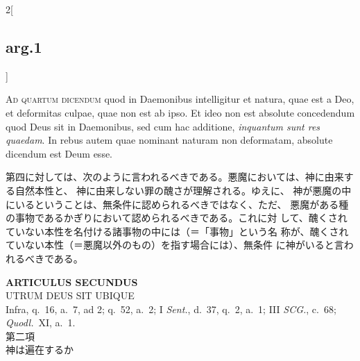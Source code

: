 \documentclass[paper=a4paper,fontsize=10pt,jafontsize=9pt,titlepage]{jlreq}
\begin{document}
\begin{paracol}{2}[\subsection{arg.1}]
\switchcolumn*[\subsection{ad.4}]

{\scshape Ad quartum dicendum} quod in Daemonibus intelligitur et natura, quae
 est a Deo, et deformitas culpae, quae non est ab ipso. Et ideo non est
 absolute concedendum quod Deus sit in Daemonibus, sed cum hac
 additione, {\itshape inquantum sunt res quaedam}. In rebus autem quae nominant
 naturam non deformatam, absolute dicendum est Deum esse.

\switchcolumn

第四に対しては、次のように言われるべきである。悪魔においては、神に由来する自然本性と、
 神に由来しない罪の醜さが理解される。ゆえに、
 神が悪魔の中にいるということは、無条件に認められるべきではなく、ただ、
 悪魔がある種の事物であるかぎりにおいて認められるべきである。これに対
 して、醜くされていない本性を名付ける諸事物の中には（＝「事物」という名
 称が、醜くされていない本性（＝悪魔以外のもの）を指す場合には）、無条件
 に神がいると言われるべきである。

\end{paracol}
\newpage
{}
 

\begin{center}
 {\Large {\bfseries ARTICULUS SECUNDUS}}\\
 {\large UTRUM DEUS SIT UBIQUE}\\
 {\footnotesize Infra, q.~16, a.~7, ad 2; q.~52, a.~2; I {\itshape
 Sent.}, d.~37, q.~2, a.~1; III {\itshape SCG.}, c.~68; {\itshape
 Quodl.}~XI, a.~1.}\\
 {\Large 第二項\\神は遍在するか}
\end{center}

{}
\setcounter{section}{2}
\setcounter{subsection}{0}
\end{document}
